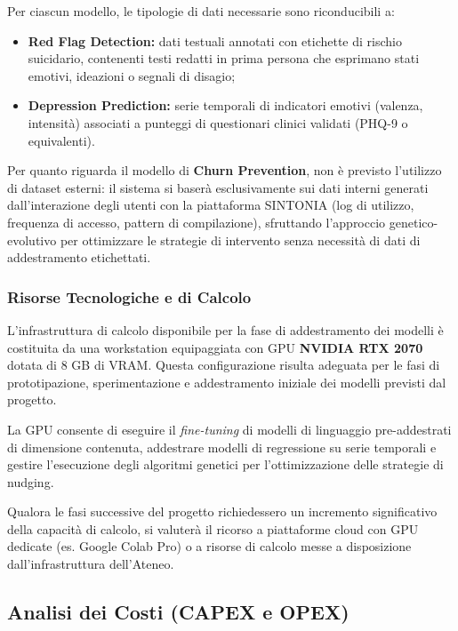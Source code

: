 Per ciascun modello, le tipologie di dati necessarie sono riconducibili a:
\begin{itemize}
    \item \textbf{Red Flag Detection:} dati testuali annotati con etichette di rischio suicidario, contenenti testi redatti in prima persona che esprimano stati emotivi, ideazioni o segnali di disagio;
    \item \textbf{Depression Prediction:} serie temporali di indicatori emotivi (valenza, intensità) associati a punteggi di questionari clinici validati (PHQ-9 o equivalenti).
\end{itemize}

Per quanto riguarda il modello di \textbf{Churn Prevention}, non è previsto l'utilizzo di dataset esterni: il sistema si baserà esclusivamente sui dati interni generati dall'interazione degli utenti con la piattaforma SINTONIA (log di utilizzo, frequenza di accesso, pattern di compilazione), sfruttando l'approccio genetico-evolutivo per ottimizzare le strategie di intervento senza necessità di dati di addestramento etichettati.

\subsubsection{Risorse Tecnologiche e di Calcolo}
\label{subsubsec:risorse_calcolo}

L'infrastruttura di calcolo disponibile per la fase di addestramento dei modelli è costituita da una workstation equipaggiata con GPU \textbf{NVIDIA RTX 2070} dotata di 8 GB di VRAM. Questa configurazione risulta adeguata per le fasi di prototipazione, sperimentazione e addestramento iniziale dei modelli previsti dal progetto.

La GPU consente di eseguire il \textit{fine-tuning} di modelli di linguaggio pre-addestrati di dimensione contenuta, addestrare modelli di regressione su serie temporali e gestire l'esecuzione degli algoritmi genetici per l'ottimizzazione delle strategie di nudging. 

Qualora le fasi successive del progetto richiedessero un incremento significativo della capacità di calcolo, si valuterà il ricorso a piattaforme cloud con GPU dedicate (es. Google Colab Pro) o a risorse di calcolo messe a disposizione dall'infrastruttura dell'Ateneo.

\clearpage
\subsection{Analisi dei Costi (CAPEX e OPEX)}
\label{subsec:analisi_costi}

